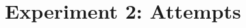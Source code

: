 \documentclass[paper.tex]{subfiles}
\begin{document}
\section{Experiment 2: Attempts }
\end{document}
